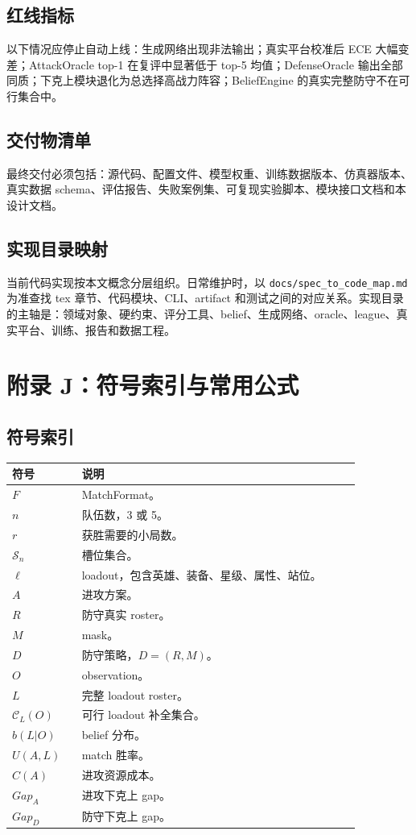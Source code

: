 \documentclass[UTF8,12pt,openany]{ctexbook}
\newcommand{\Scal}{\mathcal{S}}
\newcommand{\Ccal}{\mathcal{C}}
\begin{document}
\section{红线指标}
以下情况应停止自动上线：生成网络出现非法输出；真实平台校准后 ECE 大幅变差；AttackOracle top-1 在复评中显著低于 top-5 均值；DefenseOracle 输出全部同质；下克上模块退化为总选择高战力阵容；BeliefEngine 的真实完整防守不在可行集合中。

\section{交付物清单}
最终交付必须包括：源代码、配置文件、模型权重、训练数据版本、仿真器版本、真实数据 schema、评估报告、失败案例集、可复现实验脚本、模块接口文档和本设计文档。

\section{实现目录映射}
当前代码实现按本文概念分层组织。日常维护时，以 \texttt{docs/spec\_to\_code\_map.md} 为准查找 tex 章节、代码模块、CLI、artifact 和测试之间的对应关系。实现目录的主轴是：领域对象、硬约束、评分工具、belief、生成网络、oracle、league、真实平台、训练、报告和数据工程。

\chapter{附录 J：符号索引与常用公式}
\section{符号索引}
\begin{longtable}{p{0.18\linewidth}p{0.72\linewidth}}
\toprule
符号 & 说明 \\
\midrule
$F$ & MatchFormat。\\
$n$ & 队伍数，3 或 5。\\
$r$ & 获胜需要的小局数。\\
$\Scal_n$ & 槽位集合。\\
$\ell$ & loadout，包含英雄、装备、星级、属性、站位。\\
$A$ & 进攻方案。\\
$R$ & 防守真实 roster。\\
$M$ & mask。\\
$D$ & 防守策略，$D=(R,M)$。\\
$O$ & observation。\\
$L$ & 完整 loadout roster。\\
$\Ccal_L(O)$ & 可行 loadout 补全集合。\\
$b(L|O)$ & belief 分布。\\
$U(A,L)$ & match 胜率。\\
$C(A)$ & 进攻资源成本。\\
$Gap_A$ & 进攻下克上 gap。\\
$Gap_D$ & 防守下克上 gap。\\
\bottomrule
\end{longtable}
\end{document}
